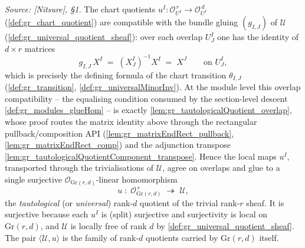 \begin{definition}\leanok
  \label{def:tautological_quotient}
  \textit{Source: [Nitsure], \S 1.}
  The chart quotients \(u^I : \mathcal{O}_{U^I}^{\,r} \to \mathcal{O}_{U^I}^{\,d}\)
  (\cref{def:gr_chart_quotient}) are compatible with the bundle gluing
  \((g_{I,J})\) of \(\mathcal{U}\) (\cref{def:gr_universal_quotient_sheaf}): over
  each overlap \(U^I_J\) one has the identity of \(d \times r\) matrices
  \[
    g_{I,J}\, X^I \;=\; (X^I_J)^{-1} X^I \;=\; X^J \qquad \text{on } U^I_J,
  \]
  which is precisely the defining formula of the chart transition
  \(\theta_{I,J}\) (\cref{def:gr_transition}, \cref{def:gr_universalMinorInv}). At the
  module level this overlap compatibility -- the equalising condition consumed by the
  section-level descent \cref{def:gr_modules_glueHom} -- is exactly
  \cref{lem:gr_tautologicalQuotient_overlap}, whose proof routes the matrix identity above
  through the rectangular pullback/composition API
  (\cref{lem:gr_matrixEndRect_pullback}, \cref{lem:gr_matrixEndRect_comp}) and the
  adjunction transpose \cref{lem:gr_tautologicalQuotientComponent_transpose}.
  Hence the local maps \(u^I\), transported through the trivialisations of
  \(\mathcal{U}\), agree on overlaps and glue to a single surjective
  \(\mathcal{O}_{\mathrm{Gr}(r,d)}\)-linear homomorphism
  \[
    u \;:\; \mathcal{O}_{\mathrm{Gr}(r,d)}^{\,r}
      \;\twoheadrightarrow\; \mathcal{U},
  \]
  the \emph{tautological} (or \emph{universal}) rank-\(d\) quotient of the trivial
  rank-\(r\) sheaf. It is surjective because each \(u^I\) is (split) surjective and
  surjectivity is local on \(\mathrm{Gr}(r,d)\), and \(\mathcal{U}\) is locally
  free of rank \(d\) by \cref{def:gr_universal_quotient_sheaf}. The pair
  \(\langle \mathcal{U}, u \rangle\) is the family of rank-\(d\) quotients carried
  by \(\mathrm{Gr}(r,d)\) itself.
\end{definition}

